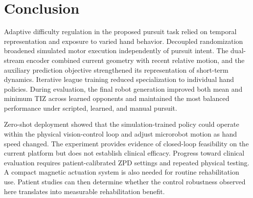 \documentclass[lettersize,journal]{IEEEtran}
\begin{document}
\section{Conclusion}
\label{sec:conclusion}
Adaptive difficulty regulation in the proposed pursuit task relied on temporal representation and exposure to varied hand behavior. Decoupled randomization broadened simulated motor execution independently of pursuit intent. The dual-stream encoder combined current geometry with recent relative motion, and the auxiliary prediction objective strengthened its representation of short-term dynamics. Iterative league training reduced specialization to individual hand policies. During evaluation, the final robot generation improved both mean and minimum TIZ across learned opponents and maintained the most balanced performance under scripted, learned, and manual pursuit.

Zero-shot deployment showed that the simulation-trained policy could operate within the physical vision-control loop and adjust microrobot motion as hand speed changed. The experiment provides evidence of closed-loop feasibility on the current platform but does not establish clinical efficacy. Progress toward clinical evaluation requires patient-calibrated ZPD settings and repeated physical testing. A compact magnetic actuation system is also needed for routine rehabilitation use. Patient studies can then determine whether the control robustness observed here translates into measurable rehabilitation benefit.

\balance


\end{document}
